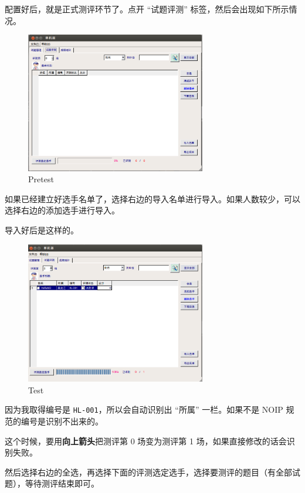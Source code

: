 配置好后，就是正式测评环节了。点开 “试题评测” 标签，然后会出现如下所示情况。

\begin{figure}[htbp]
\centering
\includegraphics[width=0.7\textwidth]{docs/intro/images/arbiter_pretest.png} 
\caption{Pretest}
\end{figure}

如果已经建立好选手名单了，选择右边的导入名单进行导入。如果人数较少，可以选择右边的添加选手进行导入。

导入好后是这样的。

\begin{figure}[htbp]
\centering
\includegraphics[width=0.7\textwidth]{docs/intro/images/arbiter_test.png} 
\caption{Test}
\end{figure}

因为我取得编号是 \texttt{HL-001}，所以会自动识别出 “所属” 一栏。如果不是 NOIP 规范的编号是识别不出来的。

这个时候，要用\textbf{向上箭头}把测评第 0 场变为测评第 1 场，如果直接修改的话会识别失败。

然后选择右边的全选，再选择下面的评测选定选手，选择要测评的题目（有全部试题），等待测评结束即可。

